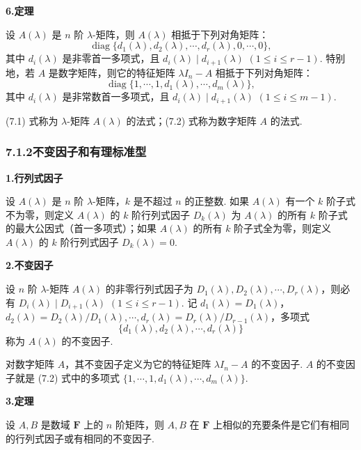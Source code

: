 \documentclass[UTF8, 12pt, fontset=fandol, oneside]{ctexart}
\begin{document}
\noindent\textbf{6.\quad 定理}

设 $A(\lambda)$ 是 $n$ 阶 $\lambda$-矩阵，则 $A(\lambda)$ 相抵于下列对角矩阵：
\begin{equation}
\operatorname{diag}\{d_1(\lambda),d_2(\lambda),\cdots,d_r(\lambda),0,\cdots,0\},
\tag{7.1}
\end{equation}
其中 $d_i(\lambda)$ 是非零首一多项式，且 $d_i(\lambda)\mid d_{i+1}(\lambda)$ $(1\le i\le r-1)$. 特别地，若 $A$ 是数字矩阵，则它的特征矩阵 $\lambda I_n-A$ 相抵于下列对角矩阵：
\begin{equation}
\operatorname{diag}\{1,\cdots,1,d_1(\lambda),\cdots,d_m(\lambda)\},
\tag{7.2}
\end{equation}
其中 $d_i(\lambda)$ 是非常数首一多项式，且 $d_i(\lambda)\mid d_{i+1}(\lambda)$ $(1\le i\le m-1)$.

(7.1) 式称为 $\lambda$-矩阵 $A(\lambda)$ 的法式；(7.2) 式称为数字矩阵 $A$ 的法式.

\subsubsection*{7.1.2\quad 不变因子和有理标准型}

\noindent\textbf{1.\quad 行列式因子}

设 $A(\lambda)$ 是 $n$ 阶 $\lambda$-矩阵，$k$ 是不超过 $n$ 的正整数. 如果 $A(\lambda)$ 有一个 $k$ 阶子式不为零，则定义 $A(\lambda)$ 的 $k$ 阶行列式因子 $D_k(\lambda)$ 为 $A(\lambda)$ 的所有 $k$ 阶子式的最大公因式（首一多项式）；如果 $A(\lambda)$ 的所有 $k$ 阶子式全为零，则定义 $A(\lambda)$ 的 $k$ 阶行列式因子 $D_k(\lambda)=0$.

\noindent\textbf{2.\quad 不变因子}

设 $n$ 阶 $\lambda$-矩阵 $A(\lambda)$ 的非零行列式因子为 $D_1(\lambda),D_2(\lambda),\cdots,D_r(\lambda)$，则必有 $D_i(\lambda)\mid D_{i+1}(\lambda)$ $(1\le i\le r-1)$. 记 $d_1(\lambda)=D_1(\lambda)$，$d_2(\lambda)=D_2(\lambda)/D_1(\lambda),\cdots,d_r(\lambda)=D_r(\lambda)/D_{r-1}(\lambda)$，多项式
\[
\{d_1(\lambda),d_2(\lambda),\cdots,d_r(\lambda)\}
\]
称为 $A(\lambda)$ 的不变因子.

对数字矩阵 $A$，其不变因子定义为它的特征矩阵 $\lambda I_n-A$ 的不变因子. $A$ 的不变因子就是 (7.2) 式中的多项式 $\{1,\cdots,1,d_1(\lambda),\cdots,d_m(\lambda)\}$.

\noindent\textbf{3.\quad 定理}

设 $A,B$ 是数域 $\mathbf{F}$ 上的 $n$ 阶矩阵，则 $A,B$ 在 $\mathbf{F}$ 上相似的充要条件是它们有相同的行列式因子或有相同的不变因子.
\end{document}
